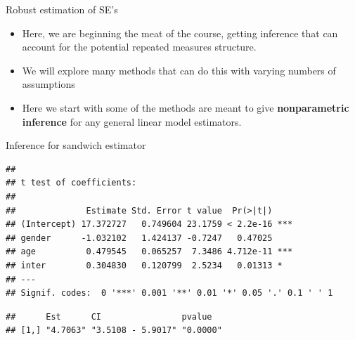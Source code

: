 \documentclass[ignorenonframetext,]{beamer}
\newenvironment{Shaded}{\begin{snugshade}}{\end{snugshade}}
\newcommand{\KeywordTok}[1]{\textcolor[rgb]{0.13,0.29,0.53}{\textbf{#1}}}
\newcommand{\DecValTok}[1]{\textcolor[rgb]{0.00,0.00,0.81}{#1}}
\newcommand{\StringTok}[1]{\textcolor[rgb]{0.31,0.60,0.02}{#1}}
\newcommand{\CommentTok}[1]{\textcolor[rgb]{0.56,0.35,0.01}{\textit{#1}}}
\newcommand{\OperatorTok}[1]{\textcolor[rgb]{0.81,0.36,0.00}{\textbf{#1}}}
\newcommand{\NormalTok}[1]{#1}
\begin{document}
\begin{frame}{Robust estimation of SE's}

\begin{itemize}
\item
  Here, we are beginning the meat of the course, getting inference that
  can account for the potential repeated measures structure.
\item
  We will explore many methods that can do this with varying numbers of
  assumptions
\item
  Here we start with some of the methods are meant to give
  \textbf{nonparametric inference} for any general linear model
  estimators.
\end{itemize}

\end{frame}

\begin{frame}[fragile]{Inference for sandwich estimator}

\tiny

\begin{Shaded}
\end{Shaded}

\begin{verbatim}
## 
## t test of coefficients:
## 
##              Estimate Std. Error t value  Pr(>|t|)    
## (Intercept) 17.372727   0.749604 23.1759 < 2.2e-16 ***
## gender      -1.032102   1.424137 -0.7247   0.47025    
## age          0.479545   0.065257  7.3486 4.712e-11 ***
## inter        0.304830   0.120799  2.5234   0.01313 *  
## ---
## Signif. codes:  0 '***' 0.001 '**' 0.01 '*' 0.05 '.' 0.1 ' ' 1
\end{verbatim}

\begin{Shaded}
\end{Shaded}

\begin{verbatim}
##      Est      CI                pvalue  
## [1,] "4.7063" "3.5108 - 5.9017" "0.0000"
\end{verbatim}

\end{frame}
\end{document}
